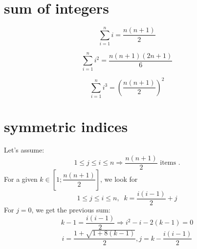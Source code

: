 \documentclass[aps,onecolumn,11pt]{revtex4}
\begin{document}
\section{sum of integers}
\begin{equation}
	\sum_{i=1}^n i = \dfrac{n(n+1)}{2}
\end{equation}

\begin{equation}
	\sum_{i=1}^n i^2 = \dfrac{n(n+1)(2n+1)}{6}
\end{equation}

\begin{equation}
	\sum_{i=1}^n i^3 = \left(\dfrac{n(n+1)}{2}\right)^2
\end{equation}

\section{symmetric indices}

Let's assume:
\begin{equation}
	1\leq j \leq i \leq n \Rightarrow \dfrac{n(n+1)}{2} \text{ items }.
\end{equation}
For a given $k\in \left[ 1;\dfrac{n(n+1)}{2}\right]$, we look for
\begin{equation}
	1\leq j \leq i \leq n, \;\; k = \frac{i(i-1)}{2}+j
\end{equation}
For $j=0$, we get the previous sum:
\begin{equation}
	k-1=\dfrac{i(i-1)}{2} \Rightarrow i^2-i - 2(k-1) = 0
\end{equation}
\begin{equation}
	i = \dfrac{1+\sqrt{1+8(k-1)}}{2}, j = k-\frac{i(i-1)}{2}
\end{equation}
\end{document}
